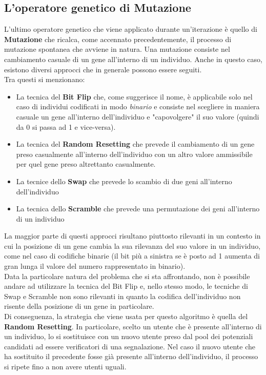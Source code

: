     \subsection{L'operatore genetico di Mutazione}
        L'ultimo operatore genetico che viene applicato durante un'iterazione è quello di \textbf{Mutazione} che ricalca, come accennato precedentemente, il processo di mutazione spontanea che avviene in natura. Una mutazione consiste nel cambiamento casuale di un gene all'interno di un individuo. Anche in questo caso, esistono diversi approcci che in generale possono essere seguiti. \\
        Tra questi si menzionano:
        \begin{itemize}
            \item La tecnica del \textbf{Bit Flip} che, come suggerisce il nome, è applicabile solo nel caso di individui codificati in modo \textit{binario} e consiste nel scegliere in maniera casuale un gene all'interno dell'individuo e "capovolgere" il suo valore (quindi da 0 si passa ad 1 e vice-versa).
            \item La tecnica del \textbf{Random Resetting} che prevede il cambiamento di un gene preso casualmente all'interno dell'individuo con un altro valore ammissibile per quel gene preso altrettanto casualmente.
            \item La tecnice dello \textbf{Swap} che prevede lo scambio di due geni all'interno dell'individuo
            \item La tecnica dello \textbf{Scramble} che prevede una permutazione dei geni all'interno di un individuo
        \end{itemize}

        La maggior parte di questi approcci risultano piuttosto rilevanti in un contesto in cui la posizione di un gene cambia la sua rilevanza del suo valore in un individuo, come nel caso di codifiche binarie (il bit più a sinistra se è posto ad 1 aumenta di gran lunga il valore del numero rappresentato in binario). \\
        Data la particolare natura del problema che si sta affrontando, non è possibile andare ad utilizzare la tecnica del Bit Flip e, nello stesso modo, le tecniche di Swap e Scramble non sono rilevanti in quanto la codifica dell'individuo non risente della posizione di un gene in particolare. \\
        Di conseguenza, la strategia che viene usata per questo algoritmo è quella del \textbf{Random Resetting}. In particolare, scelto un utente che è presente all'interno di un individuo, lo si sostituisce con un nuovo utente preso dal pool dei potenziali candidati ad essere verificatori di una segnalazione. Nel caso il nuovo utente che ha sostituito il precedente fosse già presente all'interno dell'individuo, il processo si ripete fino a non avere utenti uguali.
